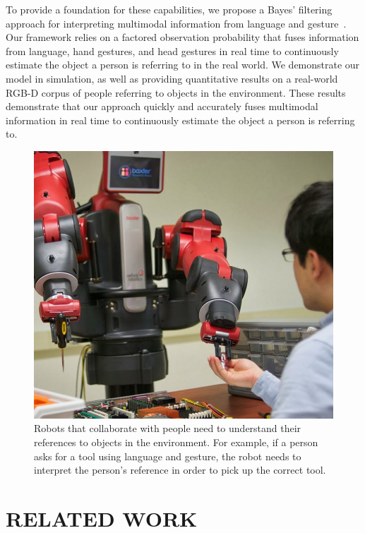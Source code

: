\documentclass[letterpaper, 10 pt, conference]{ieeeconf}
\begin{document}
To provide a foundation for these capabilities, we propose a Bayes'
filtering approach for interpreting multimodal information from
language and gesture~\citep{thrun08}.  Our framework relies on a
factored observation probability that fuses information from language,
hand gestures, and head gestures in real time to continuously estimate
the object a person is referring to in the real world.  We demonstrate
our model in simulation, as well as providing quantitative results on
a real-world RGB-D corpus of people referring to objects in the
environment.  These results demonstrate that our approach quickly and
accurately fuses multimodal information in real time to continuously
estimate the object a person is referring to.

\begin{figure}
\centering
\includegraphics[width=1\linewidth]{figures/baxter_scene_cropped.jpg}
\caption{Robots that collaborate with people need to understand their
  references to objects in the environment.  For example, if a person
  asks for a tool using language and gesture, the robot needs to
  interpret the person's reference in order to pick up the correct
  tool.\label{fig:example}}
\end{figure}

\section{RELATED WORK}
\end{document}
